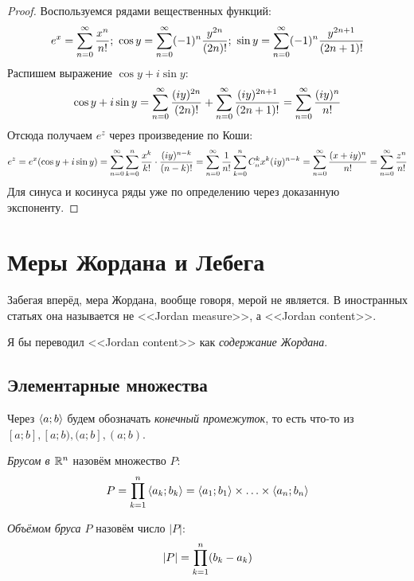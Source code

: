 \begin{proof}
	Воспользуемся рядами вещественных функций:
	\[
		e^x = \sum_{n = 0}^\infty \frac{x^n}{n!};\ \cos y = \sum_{n = 0}^\infty (-1)^n \frac{y^{2n}}{(2n)!};\ \sin y = \sum_{n = 0}^\infty (-1)^n \frac{y^{2n + 1}}{(2n + 1)!}
	\]
	Распишем выражение $\cos y + i\sin y$:
	\[
		\cos y + i\sin y = \sum_{n = 0}^\infty \frac{(iy)^{2n}}{(2n)!} + \sum_{n = 0}^\infty \frac{(iy)^{2n + 1}}{(2n + 1)!} = \sum_{n = 0}^\infty \frac{(iy)^n}{n!}
	\]
	Отсюда получаем $e^z$ через произведение по Коши:
	\[
		e^z = e^x(\cos y + i\sin y) = \sum_{n = 0}^\infty \sum\limits_{k = 0}^n \frac{x^k}{k!} \cdot \frac{(iy)^{n - k}}{(n - k)!} = \sum_{n = 0}^\infty \frac{1}{n!}\sum\limits_{k = 0}^n C_n^k x^k (iy)^{n - k} = \sum_{n = 0}^\infty \frac{(x + iy)^n}{n!} = \sum_{n = 0}^\infty \frac{z^n}{n!}
	\]
	Для синуса и косинуса ряды уже по определению через доказанную экспоненту.
\end{proof}

\section{Меры Жордана и Лебега}

\begin{note}
	Забегая вперёд, мера Жордана, вообще говоря, мерой не является. В иностранных статьях она называется не <<Jordan measure>>, а <<Jordan content>>.
\end{note}

\begin{anote}
	Я бы переводил <<Jordan content>> как \textit{содержание Жордана}.
\end{anote}

\subsection{Элементарные множества}

\begin{note}
	Через $\left\langle a; b\right\rangle$ будем обозначать \textit{конечный промежуток}, то есть что-то из $[a; b], [a; b), (a; b], (a; b)$.
\end{note}

\begin{definition}
	\textit{Брусом в $\mathbb{R}^n$} назовём множество $P$:
	\[
		P = \prod\limits_{k = 1}^n \left\langle a_k; b_k\right\rangle = \left\langle a_1; b_1\right\rangle \times \ldots \times \left\langle a_n; b_n\right\rangle
	\]
\end{definition}

\begin{definition}
	\textit{Объёмом бруса $P$} назовём число $|P|$:
	\[
		|P| = \prod\limits_{k = 1}^n (b_k - a_k)
	\]
\end{definition}

